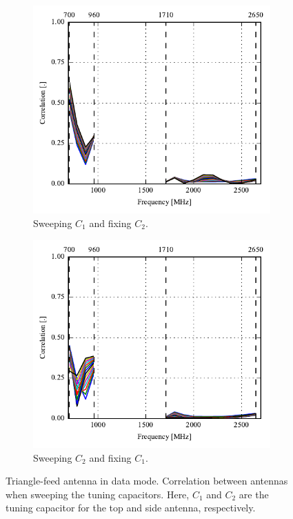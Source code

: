 \begin{figure}[htbp]
    \centering
    \begin{subfigure}{0.49\linewidth}
        \includegraphics{img/tech_sol/trianglefeed/data_mode/correlation_Csh1-sweep}
        \caption{Sweeping $C_1$ and fixing $C_2$.}
    \end{subfigure}
    \hfill
    \begin{subfigure}{0.49\linewidth}
        \includegraphics{img/tech_sol/trianglefeed/data_mode/correlation_Csh2-sweep}
        \caption{Sweeping $C_2$ and fixing $C_1$.}
    \end{subfigure}
    \caption{Triangle-feed antenna in data mode. Correlation between antennas when sweeping the tuning capacitors. Here, $C_1$ and $C_2$ are the tuning capacitor for the top and side antenna, respectively.}
    \label{fig:corr_sol2_data}
\end{figure}

